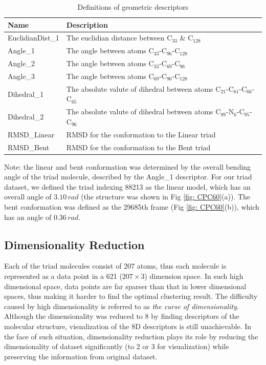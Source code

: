 \documentclass[a4paper]{article}
\begin{document}
\begin{table}[H]
    \centering
    \caption{Definitions of geometric descriptors}
    \begin{tabular}{l|l}
    \hline \hline
       \textbf{Name}  & \textbf{Description} \\
       \hline
       EuclidianDist\_1 & The euclidian distance between \(\text{C}_{33}\) \& \(\text{C}_{128}\) \\
       Angle\_1 & The angle between atoms \(\text{C}_{33}\)-\(\text{C}_{96}\)-\(\text{C}_{128}\) \\
       Angle\_2 & The angle between atoms \(\text{C}_{33}\)-\(\text{C}_{69}\)-\(\text{C}_{96}\) \\
       Angle\_3 & The angle between atoms \(\text{C}_{69}\)-\(\text{C}_{96}\)-\(\text{C}_{128}\) \\
       Dihedral\_1 & The absolute valute of dihedral between atoms \(\text{C}_{21}\)-\(\text{C}_{61}\)-\(\text{C}_{66}\)-\(\text{C}_{65}\) \\
       Dihedral\_2 & The absolute valute of dihedral between atoms \(\text{C}_{89}\)-\(\text{N}_{6}\)-\(\text{C}_{95}\)-\(\text{C}_{96}\) \\
       RMSD\_Linear & RMSD for the conformation to the Linear triad \\
       RMSD\_Bent & RMSD for the conformation to the Bent triad \\
       \hline \hline
    \end{tabular}
    
    \label{table: descriptors}
    \vspace{1ex}
    {\noindent \justifying Note: the linear and bent conformation was determined by the overall bending angle of the triad molecule, described by the Angle\_1 descriptor. For our triad dataset, we defined the triad indexing 88213 as the linear model, which has an overall angle of \(3.10\,rad\) (the structure was shown in Fig \ref{fig: CPC60}(a)). The bent conformation was defined as the 29685th frame (Fig \ref{fig: CPC60}(b)), which has an angle of \(0.36\,rad\). \par}
\end{table}

\subsection{Dimensionality Reduction}
Each of the triad molecules consist of 207 atoms, thus each molecule is represented as a data point in a 621 (\(207 \times 3\)) dimension space. In such high dimensional space, data points are far sparser than that in lower dimensional spaces, thus making it harder to find the optimal clustering result. The difficulty caused by high dimensionality is referred to as \textit{the curse of dimensionality}\cite{GeronAurelien}. Although the dimensionality was reduced to 8 by finding descriptors of the molecular structure, visualization of the 8D descriptors is still unachievable. In the face of such situation, dimensionality reduction plays its role by reducing the dimensionality of dataset significantly (to 2 or 3 for visualization) while preserving the information from original dataset\cite{GlielmoAldo}.
\end{document}
